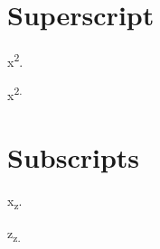 
\def\mytitle{MultiMarkdown Superscript Test}
\def\latexmode{memoir}


\chapter{Superscript}
\label{superscript}

x\textsuperscript{2}.

x\textsuperscript{2.}

\chapter{Subscripts}
\label{subscripts}

x\textsubscript{z}.

z\textsubscript{z.}




